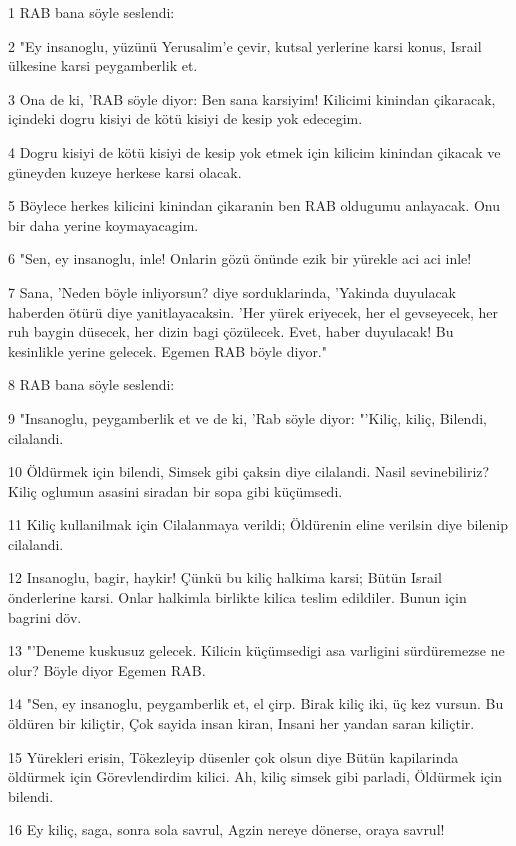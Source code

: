 \par 1 RAB bana söyle seslendi:
\par 2 "Ey insanoglu, yüzünü Yerusalim'e çevir, kutsal yerlerine karsi konus, Israil ülkesine karsi peygamberlik et.
\par 3 Ona de ki, 'RAB söyle diyor: Ben sana karsiyim! Kilicimi kinindan çikaracak, içindeki dogru kisiyi de kötü kisiyi de kesip yok edecegim.
\par 4 Dogru kisiyi de kötü kisiyi de kesip yok etmek için kilicim kinindan çikacak ve güneyden kuzeye herkese karsi olacak.
\par 5 Böylece herkes kilicini kinindan çikaranin ben RAB oldugumu anlayacak. Onu bir daha yerine koymayacagim.
\par 6 "Sen, ey insanoglu, inle! Onlarin gözü önünde ezik bir yürekle aci aci inle!
\par 7 Sana, 'Neden böyle inliyorsun? diye sorduklarinda, 'Yakinda duyulacak haberden ötürü diye yanitlayacaksin. 'Her yürek eriyecek, her el gevseyecek, her ruh baygin düsecek, her dizin bagi çözülecek. Evet, haber duyulacak! Bu kesinlikle yerine gelecek. Egemen RAB böyle diyor."
\par 8 RAB bana söyle seslendi:
\par 9 "Insanoglu, peygamberlik et ve de ki, 'Rab söyle diyor: "'Kiliç, kiliç, Bilendi, cilalandi.
\par 10 Öldürmek için bilendi, Simsek gibi çaksin diye cilalandi. Nasil sevinebiliriz? Kiliç oglumun asasini siradan bir sopa gibi küçümsedi.
\par 11 Kiliç kullanilmak için Cilalanmaya verildi; Öldürenin eline verilsin diye bilenip cilalandi.
\par 12 Insanoglu, bagir, haykir! Çünkü bu kiliç halkima karsi; Bütün Israil önderlerine karsi. Onlar halkimla birlikte kilica teslim edildiler. Bunun için bagrini döv.
\par 13 "'Deneme kuskusuz gelecek. Kilicin küçümsedigi asa varligini sürdüremezse ne olur? Böyle diyor Egemen RAB.
\par 14 "Sen, ey insanoglu, peygamberlik et, el çirp. Birak kiliç iki, üç kez vursun. Bu öldüren bir kiliçtir, Çok sayida insan kiran, Insani her yandan saran kiliçtir.
\par 15 Yürekleri erisin, Tökezleyip düsenler çok olsun diye Bütün kapilarinda öldürmek için Görevlendirdim kilici. Ah, kiliç simsek gibi parladi, Öldürmek için bilendi.
\par 16 Ey kiliç, saga, sonra sola savrul, Agzin nereye dönerse, oraya savrul!
